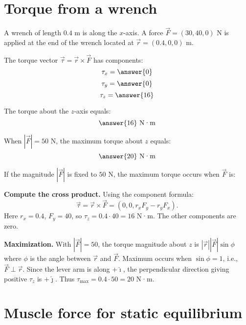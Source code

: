 \documentclass{ximera}
\begin{document}
\section{Torque from a wrench}

\begin{problem}
A wrench of length \(0.4\) m is along the \(x\)-axis. A force \(\vec F=(30,40,0)\) N is applied at the end of the wrench located at \(\vec r=(0.4,0,0)\) m.

The torque vector \(\vec\tau=\vec r\times\vec F\) has components:
\[
\tau_x = \answer{0}
\]
\[
\tau_y = \answer{0}
\]
\[
\tau_z = \answer{16}
\]

The torque about the \(z\)-axis equals:
\[
\answer{16} \text{ N·m}
\]

When \(|\vec F|=50\) N, the maximum torque about \(z\) equals:
\[
\answer{20} \text{ N·m}
\]

If the magnitude \(|\vec F|\) is fixed to \(50\) N, the maximum torque occurs when \(\vec F\) is:
\begin{multipleChoice}
\end{multipleChoice}
\end{problem}

\begin{solution}
\textbf{Compute the cross product.} Using the component formula:
\[
\vec\tau = \vec r \times \vec F = (0,0,r_x F_y - r_y F_x).
\]
Here \(r_x=0.4\), \(F_y=40\), so \(\tau_z = 0.4 \cdot 40 = 16\) N·m. The other components are zero.

\textbf{Maximization.} With \(|\vec F|=50\), the torque magnitude about \(z\) is \(|\vec r||\vec F|\sin\phi\) where \(\phi\) is the angle between \(\vec r\) and \(\vec F\). Maximum occurs when \(\sin\phi=1\), i.e., \(\vec F \perp \vec r\). Since the lever arm is along \(+\hat\imath\), the perpendicular direction giving positive \(\tau_z\) is \(+\hat\jmath\). Thus \(\tau_{\max}=0.4 \cdot 50 = 20\) N·m.
\end{solution}

\section{Muscle force for static equilibrium}
\end{document}
